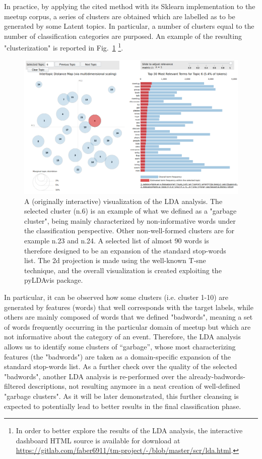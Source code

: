 \documentclass[10pt]{article}
\begin{document}
\begin{itemize}
In practice, by applying the cited method with its Sklearn implementation to the meetup corpus, a series of clusters are obtained which are labelled as to be generated by some Latent topics. 
In particular, a number of clusters equal to the number of classification categories are purposed. An example of the resulting "clusterization" is reported in Fig.~\ref{fig:lda} \footnote{In order to better explore the results of the LDA analysis, the interactive dashboard HTML source is available for download at \url{https://gitlab.com/faber6911/tm-project/-/blob/master/scr/lda.html}.}. 
\begin{figure}
\centering
\includegraphics[scale=0.35]{figs/lda.png}
\caption{\label{fig:lda} A (originally interactive) visualization of the LDA analysis. The selected cluster (n.6) is an example of what we defined as a "garbage cluster", being mainly characterized by non-informative words under the classification perspective. 
Other non-well-formed clusters are for example n.23 and n.24. 
A selected list of almost 90 words is therefore designed to be an expansion of the standard stop-words list. 
The 2d projection is made using the well-known T-sne technique, and the overall visualization is created exploiting the pyLDAvis package.}
\end{figure}
In particular, it can be observed how some clusters (i.e. cluster 1-10) are generated by features (words) that well corresponds with the target labels, while others are mainly composed of words that we defined "badwords", meaning a set of words frequently occurring in the particular domain of meetup but which are not informative about the category of an event.
Therefore, the LDA analysis allows us to identify some clusters of “garbage”, whose most characterizing features (the "badwords") are taken as a domain-specific expansion of the standard stop-words list.
As a further check over the quality of the selected "badwords", another LDA analysis is re-performed over the already-badwords-filtered descriptions, not resulting anymore in a neat creation of well-defined "garbage clusters".
As it will be later demonstrated, this further cleansing is expected to potentially lead to better results in the final classification phase.
\end{itemize}
\end{document}
